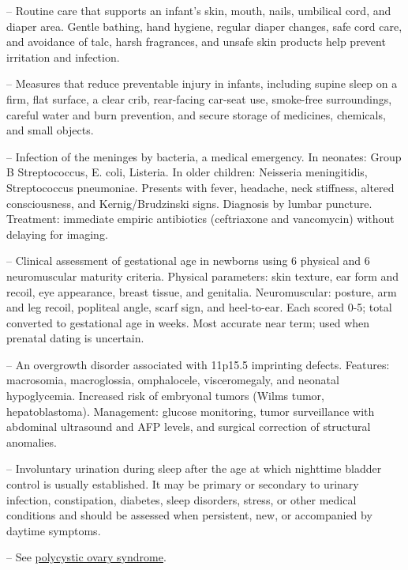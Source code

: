 -- Routine care that supports an infant's skin, mouth, nails, umbilical cord, and diaper area. Gentle bathing, hand hygiene, regular diaper changes, safe cord care, and avoidance of talc, harsh fragrances, and unsafe skin products help prevent irritation and infection.

-- Measures that reduce preventable injury in infants, including supine sleep on a firm, flat surface, a clear crib, rear-facing car-seat use, smoke-free surroundings, careful water and burn prevention, and secure storage of medicines, chemicals, and small objects.

-- Infection of the meninges by bacteria, a medical emergency. In neonates: Group B Streptococcus, E. coli, Listeria. In older children: Neisseria meningitidis, Streptococcus pneumoniae. Presents with fever, headache, neck stiffness, altered consciousness, and Kernig/Brudzinski signs. Diagnosis by lumbar puncture. Treatment: immediate empiric antibiotics (ceftriaxone and vancomycin) without delaying for imaging.

-- Clinical assessment of gestational age in newborns using 6 physical and 6 neuromuscular maturity criteria. Physical parameters: skin texture, ear form and recoil, eye appearance, breast tissue, and genitalia. Neuromuscular: posture, arm and leg recoil, popliteal angle, scarf sign, and heel-to-ear. Each scored 0-5; total converted to gestational age in weeks. Most accurate near term; used when prenatal dating is uncertain.

-- An overgrowth disorder associated with 11p15.5 imprinting defects. Features: macrosomia, macroglossia, omphalocele, visceromegaly, and neonatal hypoglycemia. Increased risk of embryonal tumors (Wilms tumor, hepatoblastoma). Management: glucose monitoring, tumor surveillance with abdominal ultrasound and AFP levels, and surgical correction of structural anomalies.

-- Involuntary urination during sleep after the age at which nighttime bladder control is usually established. It may be primary or secondary to urinary infection, constipation, diabetes, sleep disorders, stress, or other medical conditions and should be assessed when persistent, new, or accompanied by daytime symptoms.

-- See \hyperlink{Polycystic Ovary Syndrome}{polycystic ovary syndrome}.


